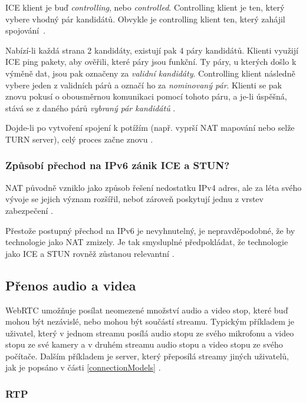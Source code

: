 ICE klient je buď \textit{controlling}, nebo \textit{controlled}. Controlling
klient je ten, který vybere vhodný pár kandidátů. Obvykle je controlling klient
ten, který zahájil spojování~\parencite{WebRTCForTheCurious}.

Nabízí-li každá strana 2 kandidáty, existují pak 4 páry kandidátů. Klienti
využijí ICE ping pakety, aby ověřili, které páry jsou funkční. Ty páry, u
kterých došlo k výměně dat, jsou pak označeny za \textit{validní kandidáty}.
Controlling klient následně vybere jeden z validních párů a označí ho za
\textit{nominovaný pár}. Klienti se pak znovu pokusí o obousměrnou komunikaci
pomocí tohoto páru, a je-li úspěšná, stává se z daného párů \textit{vybraný pár
    kandidátů} \parencite{WebRTCForTheCurious}.

Dojde-li po vytvoření spojení k potížím (např. vyprší NAT mapování nebo selže
TURN server), celý proces začne znovu \parencite{WebRTCForTheCurious}.

\subsubsection{Způsobí přechod na IPv6 zánik ICE a STUN?}

NAT původně vzniklo jako způsob řešení nedostatku IPv4 adres, ale za léta svého
vývoje se jejich význam rozšířil, neboť zároveň poskytují jednu z vrstev
zabezpečení \parencite{Quora-WillIPv6KillSTUNAndICE}.

Přestože postupný přechod na IPv6 je nevyhnutelný, je nepravděpodobné, že by
technologie jako NAT zmizely. Je tak smysluplné předpokládat, že technologie
jako ICE a STUN rovněž zůstanou relevantní \parencite{Quora-WillIPv6KillSTUNAndICE}.

\subsection{Přenos audio a videa}

WebRTC umožňuje posílat neomezené množství audio a video stop, které buď mohou
být nezávislé, nebo mohou být součástí streamu. Typickým příkladem je uživatel,
který v jednom streamu posílá audio stopu ze svého mikrofonu a video stopu ze
své kamery a v druhém streamu audio stopu a video stopu ze svého počítače.
Dalším příkladem je server, který přeposílá streamy jiných uživatelů, jak je
popsáno v části \ref{connectionModels} \parencite{WebRTCForTheCurious}.

\subsubsection{RTP}\label{rtp}

